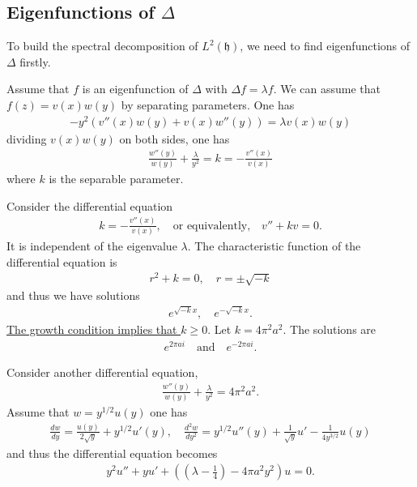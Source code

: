 \documentclass[11pt,reqno]{amsart}
\newcommand{\bea}{\begin{eqnarray}}
\newcommand{\eea}{\end{eqnarray}}
\newcommand{\bna}{\begin{eqnarray*}}
\newcommand{\ena}{\end{eqnarray*}}
\newcommand{\mk}{\mathfrak}
\theoremstyle{definition}
\begin{document}
\subsection{Eigenfunctions of $\Delta$}
To build the spectral decomposition of $L^{2}(\mk h)$,
we need to find eigenfunctions of $\Delta$ firstly.

Assume that $f$ is an eigenfunction of $\Delta$ with $\Delta f=\lambda f$.
We can assume that $f(z)=v(x)w(y)$ by separating parameters.
One has
\bna
-y^2\left(v''(x)w(y)+v(x)w''(y)\right)=\lambda v(x)w(y)
\ena
dividing $v(x)w(y)$ on both sides, one has
\bna
\frac{w''(y)}{w(y)}+\frac{\lambda}{y^2}=k= -\frac{v''(x)}{v(x)}
\ena
where $k$ is the separable parameter.

Consider the  differential equation
\bna
k= -\frac{v''(x)}{v(x)},\quad \mbox{or equivalently,}\quad
v''+kv=0.
\ena
It is independent of the eigenvalue $\lambda$.
The characteristic function of the differential equation is
\bna
r^2+k=0,\quad r=\pm \sqrt{-k}
\ena
and thus we have solutions
\bna
e^{\sqrt{-k}x},\quad e^{-\sqrt{-k}x}.
\ena
\underline{The growth condition implies that $k\geq 0$}.
Let $k=4\pi ^2 a^2$. The solutions are
\bna
e^{2\pi ai }\quad\mbox{and}\quad e^{-2\pi a i}.
\ena

Consider another differential equation,
\bna
\frac{w''(y)}{w(y)}+\frac{\lambda}{y^2}=4\pi^2 a^2.
\ena
Assume that $w=y^{1/2}u(y)$ one has
\bna
\frac{dw}{dy}=\frac{u(y)}{2\sqrt{y}}+y^{1/2}u'(y),
\quad\frac{d^2w}{dy^2}=y^{1/2}u''(y)+ \frac{1}{\sqrt{y}}u'-\frac{1}{4y^{3/2}}u(y)
\ena
and thus the differential equation becomes
\bea
y^2u''+yu'+\left((\lambda-\frac{1}{4})-4\pi a^2 y^2\right)u=0.
\label{Bessel-differential-equation}
\eea
\end{document}
